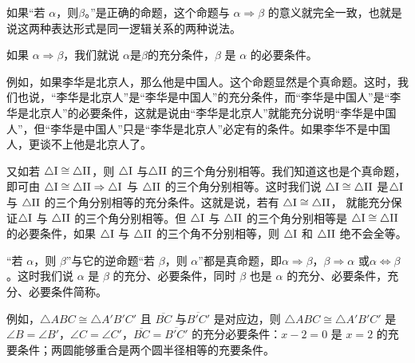 如果“若 $\alpha$，则$\beta$。”是正确的命题，这个命题与 $\alpha\Rightarrow\beta$ 的意义就完全一致，也就是说这两种表达形式是同一逻辑关系的两种说法。

\begin{blk}{}
	如果 $\alpha\Rightarrow\beta$，我们就说 $\alpha$是$\beta$的充分条件，$\beta$ 是 $\alpha$ 的必要条件。  
\end{blk}

例如，如果李华是北京人，那么他是中国人。这个命题显然是个真命题。这时，我们也说，“李华是北京人”是“李华是中国人”的充分条件，而“李华是中国人”是“李华是北京人”的必要条件，这就是说由“李华是北京人”就能充分说明“李华是中国人”，但“李华是中国人”只是“李华是北京人”必定有的条件。如果李华不是中国人，更谈不上他是北京人了。

又如若 $\triangle {\rm I}\cong \triangle {\rm II}$，则 $\triangle {\rm I}$ 与$\triangle {\rm II}$ 的三个角分别相等。我们知道这也是个真命题，即可由 $\triangle {\rm I}\cong \triangle {\rm II}\Rightarrow \triangle {\rm I}$ 与 $\triangle {\rm II}$ 的三个角分别相等。这时我们说 $\triangle {\rm I}\cong \triangle {\rm II}$ 是$\triangle {\rm I}$ 与 $\triangle {\rm II}$ 的三个角分别相等的充分条件。这就是说，若有 $\triangle {\rm I}\cong\triangle {\rm II}$， 就能充分保证$\triangle {\rm I}$ 与 $\triangle {\rm II}$ 的三个角分别相等。但 $\triangle {\rm I}$ 与 $\triangle {\rm II}$ 的三个角分别相等是 $\triangle {\rm I}\cong \triangle {\rm II}$ 的必要条件，如果 $\triangle {\rm I}$ 与 $\triangle {\rm II}$ 的三个角不分别相等，则 $\triangle {\rm I}$ 和 $\triangle {\rm II}$ 绝不会全等。

“若 $\alpha$，则 $\beta$”与它的逆命题“若 $\beta$，则 $\alpha$”都是真命题，即$\alpha\Rightarrow\beta$，$\beta\Rightarrow\alpha$ 或$\alpha\Leftrightarrow\beta$。这时我们说 $\alpha$ 是 $\beta$ 的充分、必要条件，同时 $\beta$ 也是 $\alpha$ 的充分、必要条件，充分、必要条件简称。

例如，$\triangle ABC\cong \triangle A'B'C'$ 且 $\overline{BC}$ 与$\overline{B'C'}$ 是对应边，则 $\triangle ABC\cong \triangle A'B'C'$ 是 $\angle B=\angle B'$，$\angle C=\angle C'$，$\overline{BC}=\overline{B'C'}$ 的充分必要条件：$x-2=0$ 是 $x=2$ 的充要条件；两圆能够重合是两个圆半径相等的充要条件。

